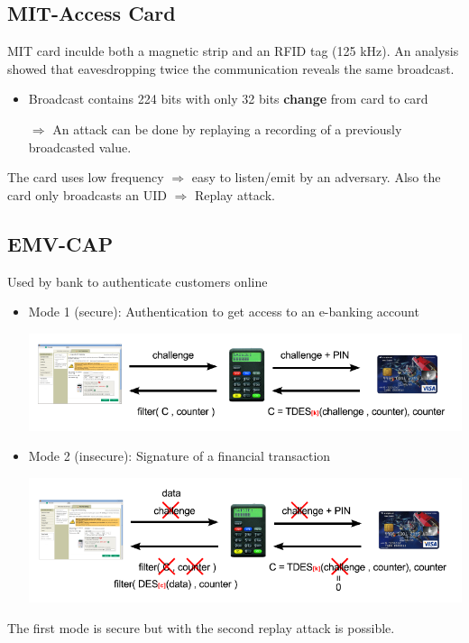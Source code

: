 

\subsection{MIT-Access Card}

MIT card inculde both a magnetic strip and an RFID tag (125 kHz).
An analysis showed that eavesdropping twice the communication 
reveals the same broadcast.
\begin{itemize}
    \item Broadcast contains 224 bits with only 32 bits \textbf{change}
            from card to card
    \item[$\Rightarrow$]An attack can be done by replaying a recording
        of a previously broadcasted value.
\end{itemize}

The card uses low frequency $\Rightarrow$ easy to listen/emit by an adversary. Also the card only broadcasts an UID $\Rightarrow$ Replay attack.

\subsection{EMV-CAP}

Used by bank to authenticate customers online 
\begin{itemize}
    \item Mode 1 (secure): Authentication to get access to an e-banking account 
	\begin{center}
		\includegraphics[scale=0.6]{img/mode1-ebanking}
	\end{center}
	
\item Mode 2 (insecure): Signature of a financial transaction
	\begin{center}
		\includegraphics[scale=0.6]{img/mode2-ebanking}
	\end{center}
\end{itemize}
The first mode is secure but with the second replay attack is possible. %


